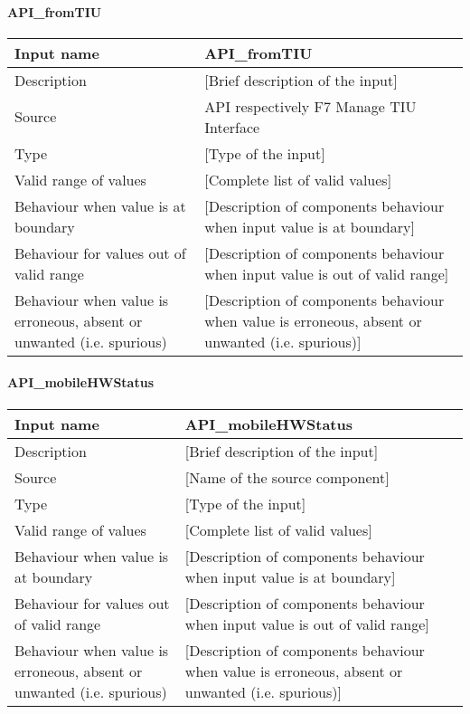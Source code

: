 \paragraph{API\_fromTIU}

\begin{longtable}{p{}p{}}
\toprule
Input name				& API\_fromTIU \\
\midrule
Description				& [Brief description of the input] \\
\midrule
Source					& API respectively F7 Manage TIU Interface \\ 
\midrule
Type					& [Type of the input] \\
\midrule
Valid range of values	& [Complete list of valid values] \\
\midrule
Behaviour when value is at boundary	& [Description of components behaviour when input value is at boundary] \\
\midrule
Behaviour for values out of valid range	& [Description of components behaviour when input value is out of valid range] \\
\midrule
Behaviour when value is erroneous, absent or unwanted (i.e. spurious) & [Description of components behaviour when value is erroneous, absent or unwanted (i.e. spurious)] \\
\bottomrule
\end{longtable}

\paragraph{API\_mobileHWStatus}

\begin{longtable}{p{}p{}}
\toprule
Input name				& API\_mobileHWStatus \\
\midrule
Description				& [Brief description of the input] \\
\midrule
Source					& [Name of the source component] \\ 
\midrule
Type					& [Type of the input] \\
\midrule
Valid range of values	& [Complete list of valid values] \\
\midrule
Behaviour when value is at boundary	& [Description of components behaviour when input value is at boundary] \\
\midrule
Behaviour for values out of valid range	& [Description of components behaviour when input value is out of valid range] \\
\midrule
Behaviour when value is erroneous, absent or unwanted (i.e. spurious) & [Description of components behaviour when value is erroneous, absent or unwanted (i.e. spurious)] \\
\bottomrule
\end{longtable}

